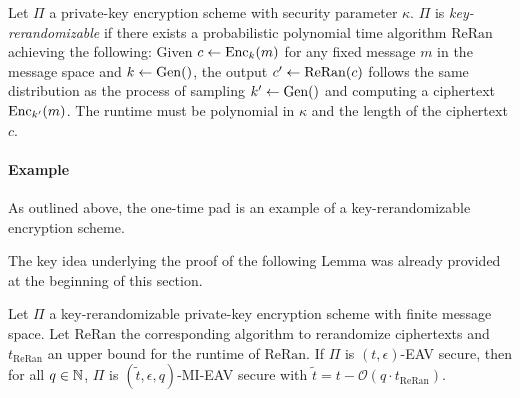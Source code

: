 \begin{definition} \label{def:key-rerandomizability}
	Let $\Pi$ a private-key encryption scheme with security parameter $\kappa$. $\Pi$ is \emph{key-rerandomizable} if there exists a probabilistic polynomial time algorithm $\mathrm{ReRan}$ achieving the following: Given $c \leftarrow \mathrm{Enc}_k(m)$ for any fixed message $m$ in the message space and $k \leftarrow \mathrm{Gen}()$, the output $c' \leftarrow \mathrm{ReRan}(c)$ follows the same distribution as the process of sampling $k' \leftarrow \mathrm{Gen}()$ and computing a ciphertext $\mathrm{Enc}_{k'}(m)$. The runtime must be polynomial in $\kappa$ and the length of the ciphertext $c$.
\end{definition}

\paragraph{Example} As outlined above, the one-time pad is an example of a key-rerandomizable encryption scheme.


The key idea underlying the proof of the following Lemma was already provided at the beginning of this section.

\begin{lemma}
	Let $\Pi$ a key-rerandomizable private-key encryption scheme with finite message space. Let $\mathrm{ReRan}$ the corresponding algorithm to rerandomize ciphertexts and $t_{\mathrm{ReRan}}$ an upper bound for the runtime of $\mathrm{ReRan}$. If $\Pi$ is $(t, \epsilon)$-EAV secure, then for all $q \in \mathbb{N}$, $\Pi$ is $(\tilde{t}, \epsilon, q)$-MI-EAV secure with $\tilde{t} = t - \mathcal{O}(q \cdot t_{\mathrm{ReRan}})$.
\end{lemma}

